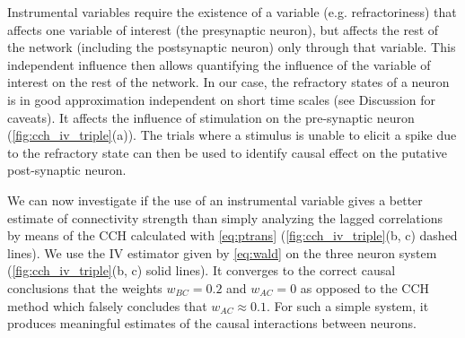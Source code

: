 \documentclass[11pt]{article}
\begin{document}
Instrumental variables require the existence of a variable (e.g. refractoriness) that affects one variable of interest (the presynaptic neuron), but affects the rest of the network (including the postsynaptic neuron) only through that variable. 
This independent influence then allows quantifying the influence of the variable of interest on the rest of the network. 
In our case, the refractory states of a neuron is in good approximation independent on short time scales (see Discussion for caveats). 
It affects the influence of stimulation on the pre-synaptic neuron (\cref{fig:cch_iv_triple}(a)). 
The trials where a stimulus is unable to elicit a spike due to the refractory state can then be used to identify causal effect on the putative post-synaptic neuron.

We can now investigate if the use of an instrumental variable gives a better estimate of connectivity strength than simply analyzing the lagged correlations by means of the CCH calculated with \cref{eq:ptrans} (\cref{fig:cch_iv_triple}(b, c) dashed lines). 
We use the IV estimator given by \cref{eq:wald} on the three neuron system (\cref{fig:cch_iv_triple}(b, c) solid lines). 
It converges to the correct causal conclusions that the weights $ w_{BC} = 0.2 $ and $ w_{AC} = 0 $ as opposed to the CCH method which falsely concludes that $ w_{AC} \approx 0.1 $. 
For such a simple system, it produces meaningful estimates of the causal interactions between neurons.
\end{document}
